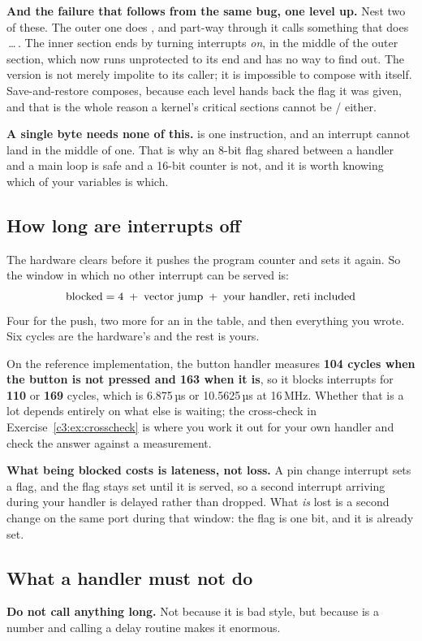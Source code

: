 \textbf{And the failure that follows from the same bug, one level up.} Nest two of these. The outer
one does , and part-way through it calls something that does \,\dots\,.
The inner section ends by turning interrupts \emph{on}, in the middle of the outer section, which
now runs unprotected to its end and has no way to find out. The  version is not merely
impolite to its caller; it is impossible to compose with itself. Save-and-restore composes, because
each level hands back the flag it was given, and that is the whole reason a kernel's critical
sections cannot be / either.

\textbf{A single byte needs none of this.}  is one instruction, and an
interrupt cannot land in the middle of one. That is why an 8-bit flag shared between a handler and
a main loop is safe and a 16-bit counter is not, and it is worth knowing which of your variables is
which.

\subsection{How long are interrupts off}
\label{c3:sec:blocked}
The hardware clears  before it pushes the program counter and  sets it again.
So the window in which no other interrupt can be served is:
\[
  \text{blocked} = 4 \;+\; \text{vector jump} \;+\; \text{your handler, \code{reti} included}
\]
Four for the push, two more for an  in the table, and then everything you wrote. Six
cycles are the hardware's and the rest is yours.

On the reference implementation, the button handler measures \textbf{104 cycles when the button
is not pressed and 163 when it is}, so it blocks interrupts for \textbf{110} or \textbf{169} cycles,
which is 6.875\,µs or 10.5625\,µs at 16\,MHz. Whether that is a lot depends entirely on what else is
waiting; the cross-check in Exercise~\ref{c3:ex:crosscheck} is where you work it out for your own
handler and check the answer against a measurement.

\textbf{What being blocked costs is lateness, not loss.} A pin change interrupt sets a flag, and
the flag stays set until it is served, so a second interrupt arriving during your handler is
delayed rather than dropped. What \emph{is} lost is a second change on the same port during that
window: the flag is one bit, and it is already set.

\subsection{What a handler must not do}
\label{c3:sec:mustnot}
\textbf{Do not call anything long.} Not because it is bad style, but because
 is a number and calling a delay routine makes it enormous.

